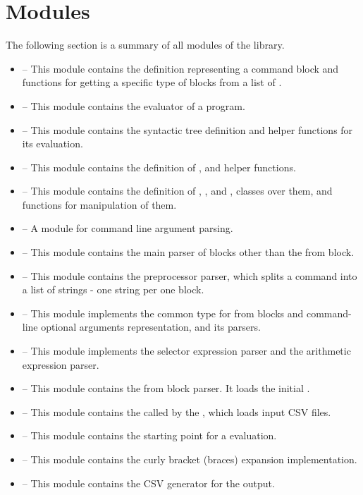 \section{Modules}
The following section is a summary of all modules of the library.
\begin{itemize}
    \item {} -- This module contains the  definition representing a command block and functions for getting a specific type of blocks from a list of .
    \item {} -- This module contains the evaluator of a \break{} program.
    \item {} -- This module contains the syntactic tree definition and helper functions for its evaluation.
    \item {} -- This module contains the definition of ,  and helper functions.
    \item {} -- This module contains the definition of , , and , classes over them, and functions for manipulation of them.
    \item {} -- A module for command line argument parsing.
    \item {} -- This module contains the main parser of blo\-cks other than the from block.
    \item {} -- This module contains the preprocessor parser, which splits a command into a list of strings - one string per one block.
    \item {} -- This module implements the common  type for from blocks and command-line optional arguments representation, and its parsers.
    \item {} -- This module implements the selector expression parser and the arithmetic expression parser.
    \item {} -- This module contains the from block parser. It loads the initial .
    \item {} -- This module contains the  called by the , which loads input CSV files.
    \item {} -- This module contains the starting point for a  evaluation.
    \item {} -- This module contains the curly bra\-cket (braces) expansion implementation.
    \item {} -- This module contains the CSV generator for the output.
\end{itemize}

